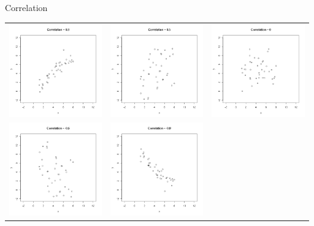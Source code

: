 \begin{frame}{Correlation}

  \hspace*{-3em}
  \begin{tabular}{rrr}
    \includegraphics[height=4cm]{img/correlation09} & 
    \includegraphics[height=4cm]{img/correlation05} &
    \includegraphics[height=4cm]{img/correlation0} \\
    \includegraphics[height=4cm]{img/correlation-05} &
    \includegraphics[height=4cm]{img/correlation-09}
  \end{tabular}


\end{frame}

